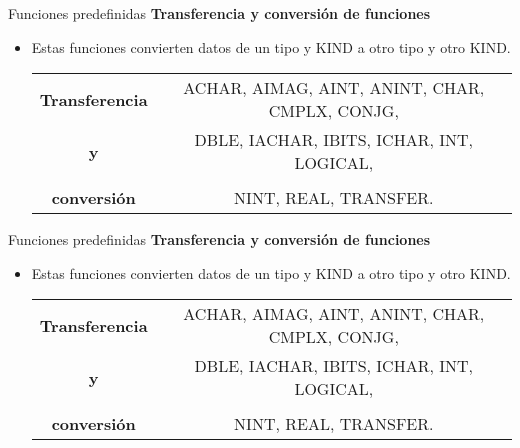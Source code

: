\begin{frame}[fragile]{Funciones predefinidas}
 \textbf{Transferencia y conversión de funciones}
 \begin{itemize}[<+(1)->]
  \item Estas funciones convierten datos de un tipo y KIND a otro tipo y otro KIND.
   \begin{table}[]
    \centering
    \label{Tabla_funciones_predefinidas}
    \resizebox{9cm}{!} {
      \begin{tabular}{|c|c|}
        \hline
        \textbf{Transferencia}  & ACHAR, AIMAG, AINT, ANINT, CHAR, CMPLX, CONJG,\\        
        \textbf{y}              & DBLE, IACHAR, IBITS, ICHAR, INT, LOGICAL,\\                                  \\
        \textbf{conversión}     & NINT, REAL, TRANSFER.                                                 \\ \hline
      \end{tabular}}
    \end{table}
 \end{itemize}
\end{frame}

\begin{frame}[fragile]{Funciones predefinidas}
 \textbf{Transferencia y conversión de funciones}
 \begin{itemize}[<+(1)->]
  \item Estas funciones convierten datos de un tipo y KIND a otro tipo y otro KIND.
   \begin{table}[]
    \centering
    \label{Tabla_funciones_predefinidas}
    \resizebox{9cm}{!} {
      \begin{tabular}{|c|c|}
        \hline
        \textbf{Transferencia}  & ACHAR, AIMAG, AINT, ANINT, CHAR, CMPLX, CONJG,\\        
        \textbf{y}              & DBLE, IACHAR, IBITS, ICHAR, INT, LOGICAL,\\                                  \\
        \textbf{conversión}     & NINT, REAL, TRANSFER.                                                 \\ \hline
      \end{tabular}}
    \end{table}
 \end{itemize}
\end{frame}